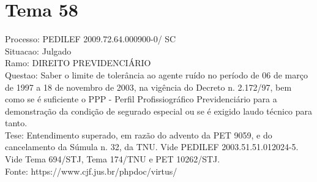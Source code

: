 \documentclass[12pt]{article}
\begin{document}
\section*{Tema 58}
Processo: PEDILEF 2009.72.64.000900-0/ SC\\
Situacao: Julgado\\
Ramo: DIREITO PREVIDENCIÁRIO\\
Questao: Saber o limite de tolerância ao agente ruído no período de 06 de março de 1997 a 18 de novembro de 2003, na vigência do Decreto n. 2.172/97, bem como se é suficiente o PPP - Perfil Profissiográfico Previdenciário para a demonstração da condição de segurado especial ou se é exigido laudo técnico para tanto.\\
Tese: Entendimento superado, em razão do advento da PET 9059, e do cancelamento da Súmula n. 32, da TNU. Vide PEDILEF 2003.51.51.012024-5. Vide Tema 694/STJ, Tema 174/TNU e PET 10262/STJ.\\
Fonte: https://www.cjf.jus.br/phpdoc/virtus/
\end{document}
